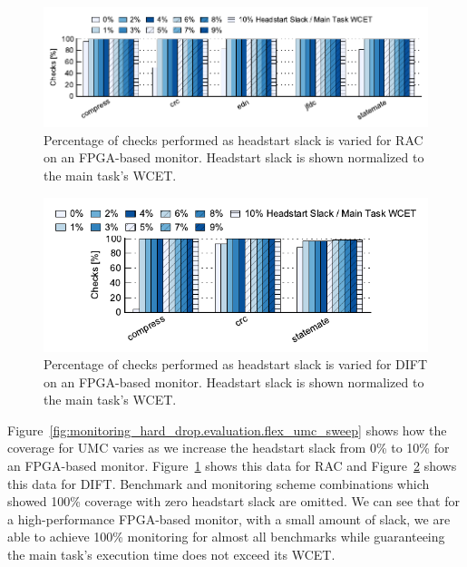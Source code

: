 \begin{figure}
  \begin{center}
    \includegraphics{monitoring_hard_drop/data/flex_lrc_sweep.pdf}
    \caption{Percentage of checks performed as headstart slack is varied for
    RAC on an FPGA-based monitor. Headstart slack is shown normalized to the
    main task's WCET.}
    \label{fig:monitoring_hard_drop.evaluation.flex_lrc_sweep}
  \end{center}
\end{figure}

\begin{figure}
  \begin{center}
    \includegraphics{monitoring_hard_drop/data/flex_dift_sweep.pdf}
    \caption{Percentage of checks performed as headstart slack is varied for
    DIFT on an FPGA-based monitor. Headstart slack is shown normalized to the
    main task's WCET.}
    \label{fig:monitoring_hard_drop.evaluation.flex_dift_sweep}
  \end{center}
\end{figure}

Figure~\ref{fig:monitoring_hard_drop.evaluation.flex_umc_sweep} shows how the
coverage for UMC varies as we increase the headstart slack from 0\% to 10\% for
an FPGA-based monitor.
Figure~\ref{fig:monitoring_hard_drop.evaluation.flex_lrc_sweep} shows this data
for RAC and Figure~\ref{fig:monitoring_hard_drop.evaluation.flex_dift_sweep}
shows this data for DIFT. Benchmark and monitoring scheme combinations which
showed 100\% coverage with zero headstart slack are omitted.  We can see that
for a high-performance FPGA-based monitor, with a small amount of slack, we are
able to achieve 100\% monitoring for almost all benchmarks while guaranteeing
the main task's execution time does not exceed its WCET. 

